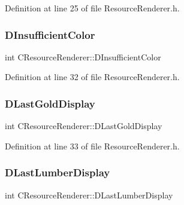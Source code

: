 Definition at line 25 of file Resource\+Renderer.\+h.

\hypertarget{classCResourceRenderer_a628700620a91412c1624fae0db8a9ebb}{}\label{classCResourceRenderer_a628700620a91412c1624fae0db8a9ebb} 
\subsubsection{\texorpdfstring{D\+Insufficient\+Color}{DInsufficientColor}}
{\footnotesize\ttfamily int C\+Resource\+Renderer\+::\+D\+Insufficient\+Color\hspace{0.3cm}{\ttfamily [protected]}}



Definition at line 32 of file Resource\+Renderer.\+h.

\hypertarget{classCResourceRenderer_ae96b899e2b8f19105a6e5d1e2f741abd}{}\label{classCResourceRenderer_ae96b899e2b8f19105a6e5d1e2f741abd} 
\subsubsection{\texorpdfstring{D\+Last\+Gold\+Display}{DLastGoldDisplay}}
{\footnotesize\ttfamily int C\+Resource\+Renderer\+::\+D\+Last\+Gold\+Display\hspace{0.3cm}{\ttfamily [protected]}}



Definition at line 33 of file Resource\+Renderer.\+h.

\hypertarget{classCResourceRenderer_a9e2658ecff79b486956e118114a2fb52}{}\label{classCResourceRenderer_a9e2658ecff79b486956e118114a2fb52} 
\subsubsection{\texorpdfstring{D\+Last\+Lumber\+Display}{DLastLumberDisplay}}
{\footnotesize\ttfamily int C\+Resource\+Renderer\+::\+D\+Last\+Lumber\+Display\hspace{0.3cm}{\ttfamily [protected]}}




